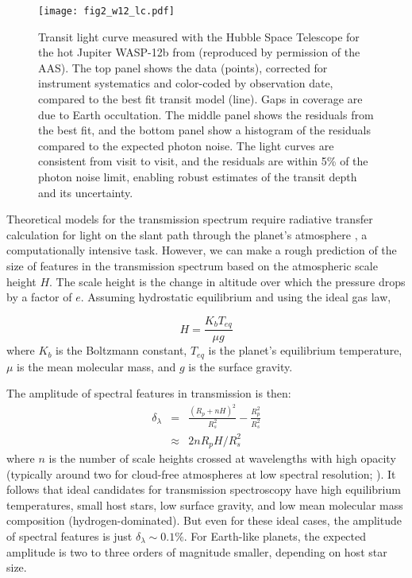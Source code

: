 \documentclass[graybox,natbib,nosecnum]{svmult}
\begin{document}
\begin{figure}
\begin{centering}
\texttt{[image: fig2\_w12\_lc.pdf]}
\caption{Transit light curve measured with the Hubble Space Telescope for the hot Jupiter WASP-12b from \citealt{kreidberg15b} (reproduced by permission of the AAS). The top panel shows the data (points), corrected for instrument systematics and color-coded by observation date, compared to the best fit transit model (line). Gaps in coverage are due to Earth occultation. The middle panel shows the residuals from the best fit, and the bottom panel show a histogram of the residuals compared to the expected photon noise. The light curves are consistent from visit to visit, and the residuals are within 5\% of the photon noise limit, enabling robust estimates of the transit depth and its uncertainty.}
\label{fig:lc}       
\end{centering}
\end{figure}

Theoretical models for the transmission spectrum require radiative transfer calculation for light on the slant path through the planet's atmosphere \citep{seager00}, a computationally intensive task. However, we can make a rough prediction of the size of features in the transmission spectrum based on the atmospheric scale height $H$. The scale height is the change in altitude over which the pressure drops by a factor of $e$. Assuming hydrostatic equilibrium and using the ideal gas law,

\begin{equation}
H = \frac{K_bT_{eq}}{\mu g}
\end{equation}
where $K_b$ is the Boltzmann constant, $T_{eq}$ is the planet's equilibrium temperature, $\mu$ is the mean molecular mass, and $g$ is the surface gravity.

The amplitude of spectral features in transmission is then:
\begin{eqnarray}
\delta_\lambda &=& \frac{(R_p + nH)^2}{R_s^2} - \frac{R_p^2}{R_s^2}\\
 & \approx & 2nR_pH/R_s^2
\end{eqnarray} 
where $n$ is the number of scale heights crossed at wavelengths with high opacity (typically around two for cloud-free atmospheres at low spectral resolution; \citealt{stevenson16}). It follows that ideal candidates for transmission spectroscopy have high equilibrium temperatures, small host stars, low surface gravity, and low mean molecular mass composition (hydrogen-dominated). But even for these ideal cases, the amplitude of spectral features is just $\delta_\lambda \sim0.1\%$. For Earth-like planets, the expected amplitude is two to three orders of magnitude smaller, depending on host star size. 
\end{document}
